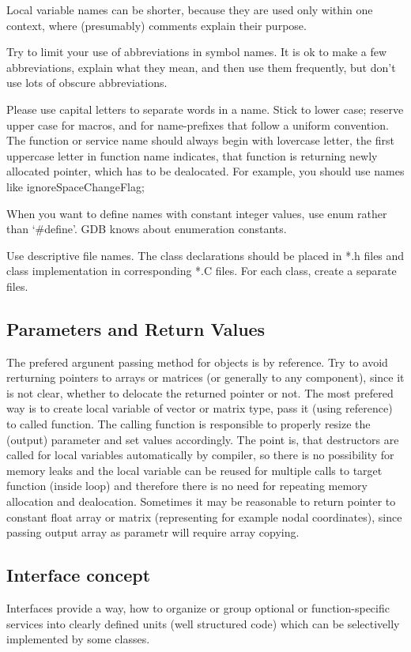 \documentclass[a4paper]{article}
\begin{document}
Local variable names can be shorter, because they are used only within one context, where (presumably) comments explain
their purpose. 

Try to limit your use of abbreviations in symbol names. It is ok to make a few abbreviations, explain what they mean, and
then use them frequently, but don't use lots of obscure abbreviations. 

Please use capital letters to separate words in a name. Stick to
lower case; reserve upper case for macros, and for name-prefixes that
follow a uniform convention. The function or service name should always begin with lovercase
letter, the first uppercase letter in function name indicates, that
function is returning newly allocated pointer, which has to be dealocated.
For example, you should use names like ignoreSpaceChangeFlag; 

When you want to define names with constant integer values, use enum rather than `\#define'. GDB knows about
enumeration constants. 

Use descriptive file names. The class declarations should be placed in *.h files
and class implementation in corresponding *.C files. For each class, create a separate files.


\subsection{Parameters and Return Values}

The prefered argunent passing method for objects is by reference. 
Try to avoid rerturning pointers to arrays or matrices (or generally
to any component), since it is not clear, whether to delocate the
returned pointer or not. The most prefered way is to create local
variable of vector or matrix type, pass it (using reference) to called
function. The calling function is responsible to properly resize the
(output) parameter and set values accordingly. The point is, that
destructors are called for local variables automatically by compiler,
so there is no possibility for memory leaks and the local variable can
be reused for multiple calls to target function (inside loop) and
therefore there is no need for repeating memory allocation and
dealocation. Sometimes it may be reasonable to return pointer to
constant float array or matrix (representing for example
nodal coordinates), since passing output array as parametr will require 
array copying. 

\subsection{Interface concept}
Interfaces provide a way, how to organize or group optional or function-specific services into 
clearly defined units (well structured code) which can be
selectivelly implemented by some classes.
\end{document}
